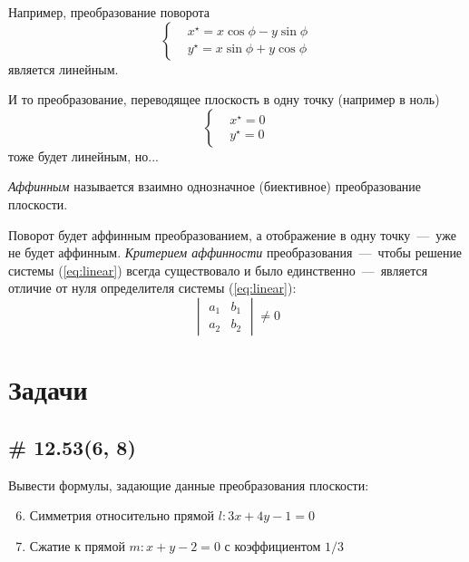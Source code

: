 \documentclass[a4paper,12pt]{article}
\begin{document}
  Например, преобразование поворота
  \[
    \left\{
      \begin{aligned}
        &x^\star = x\cos\phi - y\sin\phi\\
        &y^\star = x\sin\phi + y\cos\phi
      \end{aligned}
    \right.
  \]
  является линейным.
  
  И то преобразование, переводящее плоскость в одну точку (например в ноль)
  \[
    \left\{
      \begin{aligned}
        &x^\star = 0\\
        &y^\star = 0
      \end{aligned}
    \right.
  \]
  тоже будет линейным, но...
  
  \begin{definition}
    \emph{Аффинным} называется взаимно однозначное (биективное) преобразование плоскости.
  \end{definition}
  
  Поворот будет аффинным преобразованием, а отображение в одну точку~---~уже не будет аффинным.
  \emph{Критерием аффинности} преобразования~---~чтобы решение системы (\ref{eq:linear}) всегда существовало и было единственно~---~является отличие от нуля определителя системы (\ref{eq:linear}):
  \[
    \begin{vmatrix} a_1 & b_1\\ a_2 & b_2\end{vmatrix} \not= 0
  \]
  
  
  
  \section{Задачи}
  
  
  \subsection{\# 12.53(6, 8)}
  
  Вывести формулы, задающие данные преобразования плоскости:
  \begin{enumerate}
    \setcounter{enumi}{5}
    
    \item Симметрия относительно прямой $l\colon 3x + 4y - 1 = 0$
    
    \setcounter{enumi}{7}
    
    \item Сжатие к прямой $m\colon x + y - 2 = 0$ с коэффициентом $1/3$
  \end{enumerate}
  
\end{document}

